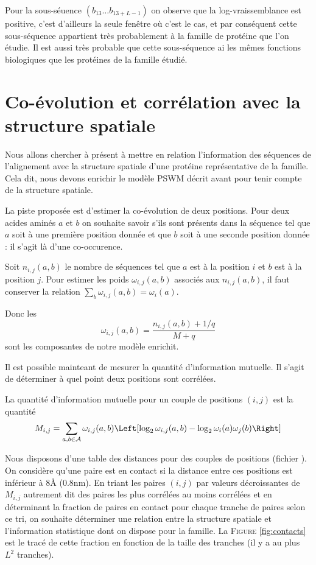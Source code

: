 \documentclass[a4paper, french]{article}
\begin{document}
Pour la sous-s\'euence $(b_{13}\ldots b_{13+L-1})$ on observe que la
log-vraissemblance est positive, c'est d'ailleurs la seule fen\^etre o\`u
c'est le cas, et par cons\'equent cette sous-s\'equence
appartient tr\`es probablement \`a la famille de prot\'eine que l'on \'etudie.
Il est aussi tr\`es probable que cette sous-s\'equence
ai les m\^emes fonctions biologiques que les prot\'eines
de la famille \'etudi\'e.

\section{Co-\'evolution et corr\'elation avec la structure spatiale}

Nous allons chercher \`a pr\'esent \`a mettre en relation l'information
des s\'equences de l'alignement avec la structure spatiale d'une prot\'eine
repr\'esentative de la famille. Cela dit, nous devons enrichir le mod\`ele
PSWM d\'ecrit avant pour tenir compte de la structure spatiale.

La piste
propos\'ee est d'estimer la co-\'evolution de deux positions. Pour deux
acides amin\'es $a$ et $b$ on souhaite savoir s'ils sont pr\'esents dans la
s\'equence tel que $a$ soit \`a une premi\`ere position donn\'ee et que $b$ soit
\`a une seconde position donn\'ee : il s'agit l\`a d'une co-occurence.

Soit $n_{i,j}(a,b)$ le nombre de s\'equences tel que 
$a$ est \`a la position $i$ et $b$ est \`a la position $j$.
Pour estimer les poids $\omega_{i,j}(a,b)$ associ\'es aux $n_{i,j}(a,b)$,
il faut conserver la relation $\sum_b \omega_{i,j}(a,b)=\omega_i(a)$.

Donc les
\begin{equation*}
    \omega_{i,j}(a,b)=
    \frac{n_{i,j}(a,b) + 1/q}{M+q}
\end{equation*}
sont les composantes de notre mod\`ele enrichit.

Il est possible mainteant de mesurer la quantit\'e d'information mutuelle.
Il s'agit de d\'eterminer \`a quel point deux positions sont corr\'el\'ees.

La quantit\'e d'information mutuelle pour un couple de positions
$(i,j)$ est la quantit\'e
\begin{equation*}
    M_{i,j}=\sum_{a,b\in\mathcal{A}}\omega_{i,j}(a,b)
    \Left[\log_2{\omega_{i,j}(a,b)}-\log_2{\omega_i(a)\omega_j(b)}\Right]
\end{equation*}

Nous disposons d'une table des distances pour des couples de positions
(fichier ). On consid\`ere qu'une paire est en
contact si la distance entre ces positions est inf\'erieur \`a 8\r A (0.8nm).
En triant les paires $(i,j)$ par valeurs
d\'ecroissantes de $M_{i,j}$ autrement dit des paires les plus corr\'el\'ees
au moins corr\'el\'ees et en d\'eterminant la fraction de paires en contact
pour chaque tranche de paires selon ce tri, on souhaite d\'eterminer 
une relation entre la structure spatiale et l'information statistique
dont on dispose pour la famille.  
La F\textsc{igure} \ref{fig:contacts} est le trac\'e de cette fraction
en fonction de la taille des tranches (il y a au plus $L^2$ tranches).
\end{document}
